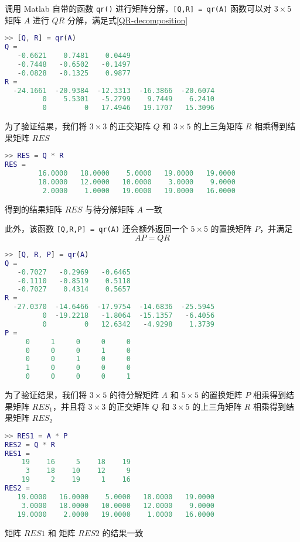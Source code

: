 调用 Matlab 自带的函数 \lstinline|qr()| 进行矩阵分解，\lstinline|[Q,R] = qr(A)| 函数可以对 $3\times 5$ 矩阵 $A$ 进行 $QR$ 分解，满足式\ref{QR-decomposition}

\begin{lstlisting}[language=Matlab]  
>> [Q, R] = qr(A)
Q =
   -0.6621    0.7481    0.0449
   -0.7448   -0.6502   -0.1497
   -0.0828   -0.1325    0.9877
R =
  -24.1661  -20.9384  -12.3313  -16.3866  -20.6074
         0    5.5301   -5.2799    9.7449    6.2410
         0         0   17.4946   19.1707   15.3096
\end{lstlisting}

为了验证结果，我们将 $3\times 3$ 的正交矩阵 $Q$ 和 $3\times 5$ 的上三角矩阵 $R$ 相乘得到结果矩阵 $RES$
\begin{lstlisting}[language=Matlab]  
>> RES = Q * R
RES =
        16.0000   18.0000    5.0000   19.0000   19.0000
        18.0000   12.0000   10.0000    3.0000    9.0000
         2.0000    1.0000   19.0000   19.0000   16.0000
\end{lstlisting}
得到的结果矩阵 $RES$ 与待分解矩阵 $A$ 一致


此外，该函数 \lstinline|[Q,R,P] = qr(A)| 还会额外返回一个 $5\times 5$ 的置换矩阵 $P$，并满足 
\begin{equation}
    AP = QR
\end{equation}
\begin{lstlisting}[language=Matlab]  
>> [Q, R, P] = qr(A)
Q =
   -0.7027   -0.2969   -0.6465
   -0.1110   -0.8519    0.5118
   -0.7027    0.4314    0.5657
R =
  -27.0370  -14.6466  -17.9754  -14.6836  -25.5945
         0  -19.2218   -1.8064  -15.1357   -6.4056
         0         0   12.6342   -4.9298    1.3739
P =
     0     1     0     0     0
     0     0     0     1     0
     0     0     1     0     0
     1     0     0     0     0
     0     0     0     0     1
\end{lstlisting}

为了验证结果，我们将
$3\times 5$ 的待分解矩阵 $A$ 和 $5\times 5$ 的置换矩阵 $P$ 相乘得到结果矩阵 $RES_1$，并且将
$3\times 3$ 的正交矩阵 $Q$ 和 $3\times 5$ 的上三角矩阵 $R$ 相乘得到结果矩阵 $RES_2$
\begin{lstlisting}[language=Matlab]  
>> RES1 = A * P
RES2 = Q * R
RES1 =
    19    16     5    18    19
     3    18    10    12     9
    19     2    19     1    16
RES2 =
   19.0000   16.0000    5.0000   18.0000   19.0000
    3.0000   18.0000   10.0000   12.0000    9.0000
   19.0000    2.0000   19.0000    1.0000   16.0000
\end{lstlisting}
矩阵 $RES1$ 和 矩阵 $RES2$ 的结果一致


